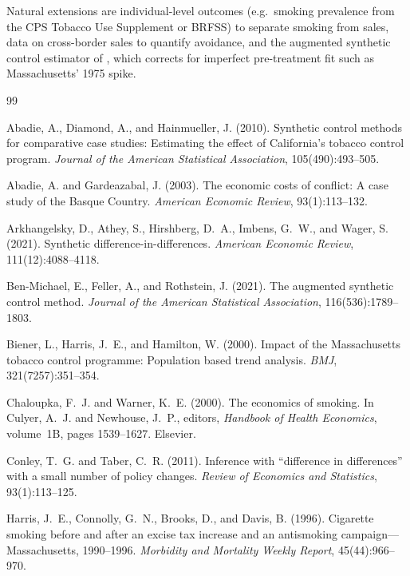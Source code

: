 \documentclass[11pt]{article}
\begin{document}
Natural extensions are individual-level outcomes (e.g.\ smoking prevalence
from the CPS Tobacco Use Supplement or BRFSS) to separate smoking from sales,
data on cross-border sales to quantify avoidance, and the augmented synthetic
control estimator of \citet{benmichael2021}, which corrects for imperfect
pre-treatment fit such as Massachusetts' 1975 spike.

\begin{thebibliography}{99}

Abadie, A., Diamond, A., and Hainmueller, J. (2010).
Synthetic control methods for comparative case studies: Estimating the effect
of California's tobacco control program.
\emph{Journal of the American Statistical Association}, 105(490):493--505.

Abadie, A. and Gardeazabal, J. (2003).
The economic costs of conflict: A case study of the Basque Country.
\emph{American Economic Review}, 93(1):113--132.

Arkhangelsky, D., Athey, S., Hirshberg, D.~A., Imbens, G.~W., and Wager, S. (2021).
Synthetic difference-in-differences.
\emph{American Economic Review}, 111(12):4088--4118.

Ben-Michael, E., Feller, A., and Rothstein, J. (2021).
The augmented synthetic control method.
\emph{Journal of the American Statistical Association}, 116(536):1789--1803.

Biener, L., Harris, J.~E., and Hamilton, W. (2000).
Impact of the Massachusetts tobacco control programme: Population based trend
analysis. \emph{BMJ}, 321(7257):351--354.

Chaloupka, F.~J. and Warner, K.~E. (2000).
The economics of smoking. In Culyer, A.~J. and Newhouse, J.~P., editors,
\emph{Handbook of Health Economics}, volume~1B, pages 1539--1627. Elsevier.

Conley, T.~G. and Taber, C.~R. (2011).
Inference with ``difference in differences'' with a small number of policy
changes. \emph{Review of Economics and Statistics}, 93(1):113--125.

Harris, J.~E., Connolly, G.~N., Brooks, D., and Davis, B. (1996).
Cigarette smoking before and after an excise tax increase and an antismoking
campaign---Massachusetts, 1990--1996.
\emph{Morbidity and Mortality Weekly Report}, 45(44):966--970.


\end{thebibliography}
\end{document}
